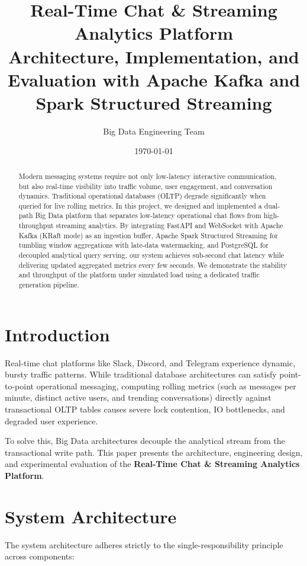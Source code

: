 \documentclass[11pt,a4paper]{article}
\title{\textbf{Real-Time Chat \& Streaming Analytics Platform}\\
\large Architecture, Implementation, and Evaluation with Apache Kafka and Spark Structured Streaming}
\author{Big Data Engineering Team}
\date{\today}
\begin{document}
\maketitle

\begin{abstract}
Modern messaging systems require not only low-latency interactive communication, but also real-time visibility into traffic volume, user engagement, and conversation dynamics. Traditional operational databases (OLTP) degrade significantly when queried for live rolling metrics. In this project, we designed and implemented a dual-path Big Data platform that separates low-latency operational chat flows from high-throughput streaming analytics. By integrating FastAPI and WebSocket with Apache Kafka (KRaft mode) as an ingestion buffer, Apache Spark Structured Streaming for tumbling window aggregations with late-data watermarking, and PostgreSQL for decoupled analytical query serving, our system achieves sub-second chat latency while delivering updated aggregated metrics every few seconds. We demonstrate the stability and throughput of the platform under simulated load using a dedicated traffic generation pipeline.
\end{abstract}

\section{Introduction}
Real-time chat platforms like Slack, Discord, and Telegram experience dynamic, bursty traffic patterns. While traditional database architectures can satisfy point-to-point operational messaging, computing rolling metrics (such as messages per minute, distinct active users, and trending conversations) directly against transactional OLTP tables causes severe lock contention, IO bottlenecks, and degraded user experience.

To solve this, Big Data architectures decouple the analytical stream from the transactional write path. This paper presents the architecture, engineering design, and experimental evaluation of the \textbf{Real-Time Chat \& Streaming Analytics Platform}.

\section{System Architecture}
The system architecture adheres strictly to the single-responsibility principle across components:
\end{document}
